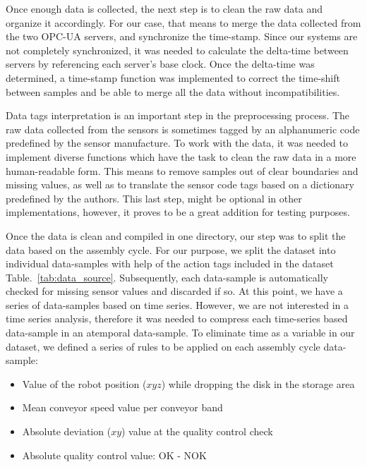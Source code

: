 \documentclass[5p,times,procedia]{elsarticle}
\begin{document}
Once enough data is collected, the next step is to clean the raw data and organize it accordingly. For our case, that means to merge the data collected from the two OPC-UA servers, and synchronize the time-stamp. Since our systems are not completely synchronized, it was needed to calculate the delta-time between servers by referencing each server's base clock. Once the delta-time was determined, a time-stamp function was implemented to correct the time-shift between samples and be able to merge all the data without incompatibilities.

Data tags interpretation is an important step in the preprocessing process. The raw data collected from the sensors is sometimes tagged by an alphanumeric code predefined by the sensor manufacture. To work with the data, it was needed to implement diverse functions which have the task to clean the raw data in a more human-readable form. This means to remove samples out of clear boundaries and missing values, as well as to translate the sensor code tags based on a dictionary predefined by the authors. This last step, might be optional in other implementations, however, it proves to be a great addition for testing purposes.

Once the data is clean and compiled in one directory, our step was to split the data based on the assembly cycle. For our purpose, we split the dataset into individual data-samples with help of the action tags included in the dataset Table.~\ref{tab:data_source}. Subsequently, each data-sample is automatically checked for missing sensor values and discarded if so. At this point, we have a series of data-samples based on time series. However, we are not interested in a time series analysis, therefore it was needed to compress each time-series based data-sample in an atemporal data-sample.
To eliminate time as a variable in our dataset, we defined a series of rules to be applied on each assembly cycle data-sample:

\begin{itemize}
       \item Value of the robot position ($xyz$) while dropping the disk in the storage area
       \item Mean conveyor speed value per conveyor band
       \item Absolute deviation ($xy$) value at the quality control check
       \item Absolute quality control value: OK - NOK
\end{itemize}
\end{document}
